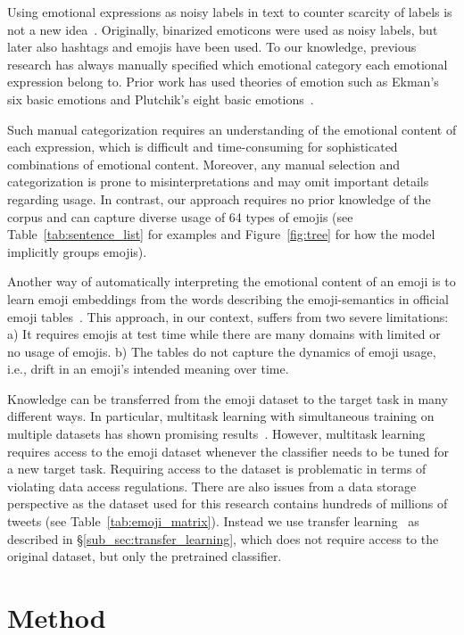 \documentclass[11pt,a4paper]{article}
\begin{document}
Using emotional expressions as noisy labels in text to counter scarcity of labels is not a new idea~\cite{read2005using, go2009twitter}. Originally, binarized emoticons were used as noisy labels, but later also hashtags and emojis have been used. To our knowledge, previous research has always manually specified which emotional category each emotional expression belong to. Prior work has used theories of emotion such as Ekman's six basic emotions and Plutchik's eight basic emotions~\cite{mohammad2012emotional,suttles2013}.

Such manual categorization requires an understanding of the emotional content of each expression, which is difficult and time-consuming for sophisticated combinations of emotional content. Moreover, any manual selection and categorization is prone to misinterpretations and may omit important details regarding usage. In contrast, our approach requires no prior knowledge of the corpus and can capture diverse usage of 64 types of emojis (see Table~\ref{tab:sentence_list} for examples and Figure~\ref{fig:tree} for how the model implicitly groups emojis).

Another way of automatically interpreting the emotional content of an emoji is to learn emoji embeddings from the words describing the emoji-semantics in official emoji tables~\cite{eisner2016emoji2vec}. This approach, in our context, suffers from two severe limitations: a) It requires emojis at test time while there are many domains with limited or no usage of emojis. b) The tables do not capture the dynamics of emoji usage, i.e., drift in an emoji's intended meaning over time.

Knowledge can be transferred from the emoji dataset to the target task in many different ways. In particular, multitask learning with simultaneous training on multiple datasets has shown promising results~\cite{collobert2008unified}. However, multitask learning requires access to the emoji dataset whenever the classifier needs to be tuned for a new target task. Requiring access to the dataset is problematic in terms of violating data access regulations. There are also issues from a data storage perspective as the dataset used for this research contains hundreds of millions of tweets (see Table~\ref{tab:emoji_matrix}). Instead we use transfer learning~\cite{bengio2012deep} as described in \S\ref{sub_sec:transfer_learning}, which does not require access to the original dataset, but only the pretrained classifier.

\section{Method}
\label{sec:method}
\end{document}
